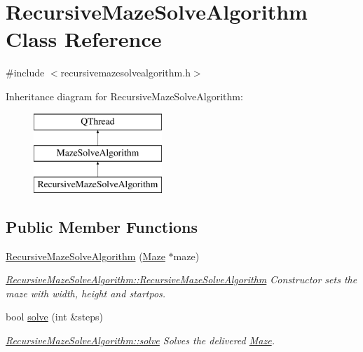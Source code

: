 \hypertarget{class_recursive_maze_solve_algorithm}{\section{Recursive\-Maze\-Solve\-Algorithm Class Reference}
\label{class_recursive_maze_solve_algorithm}
}


{\ttfamily \#include $<$recursivemazesolvealgorithm.\-h$>$}

Inheritance diagram for Recursive\-Maze\-Solve\-Algorithm\-:\begin{figure}[H]
\begin{center}
\leavevmode
\includegraphics[height=3.000000cm]{class_recursive_maze_solve_algorithm}
\end{center}
\end{figure}
\subsection*{Public Member Functions}
\begin{DoxyCompactItemize}
\item 
\hyperlink{class_recursive_maze_solve_algorithm_a62a60de4fb81a35cae475eabc5a5a66e}{Recursive\-Maze\-Solve\-Algorithm} (\hyperlink{class_maze}{Maze} $\ast$maze)
\begin{DoxyCompactList}\small\item\em \hyperlink{class_recursive_maze_solve_algorithm_a62a60de4fb81a35cae475eabc5a5a66e}{Recursive\-Maze\-Solve\-Algorithm\-::\-Recursive\-Maze\-Solve\-Algorithm} Constructor sets the maze with width, height and startpos. \end{DoxyCompactList}\item 
bool \hyperlink{class_recursive_maze_solve_algorithm_a15c3571e131dffc45ab62a2073aa0da4}{solve} (int \&steps)
\begin{DoxyCompactList}\small\item\em \hyperlink{class_recursive_maze_solve_algorithm_a15c3571e131dffc45ab62a2073aa0da4}{Recursive\-Maze\-Solve\-Algorithm\-::solve} Solves the delivered \hyperlink{class_maze}{Maze}. \end{DoxyCompactList}\end{DoxyCompactItemize}
